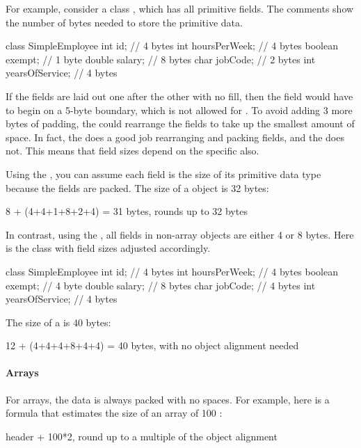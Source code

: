 For example, consider a class , which has all primitive fields.
The comments show the number of bytes needed to store the primitive data.

\begin{shortlisting}
class SimpleEmployee {
    int id;               // 4 bytes
    int hoursPerWeek;     // 4 bytes       
    boolean exempt;       // 1 byte          
    double salary;        // 8 bytes          
    char jobCode;         // 2 bytes           
    int yearsOfService;   // 4 bytes      	
}
\end{shortlisting}

If the fields are laid out one after the other with no fill, then the
field  would have to begin on a 5-byte boundary, which is not allowed for
. To avoid adding 3 more bytes of padding, the \jre could rearrange the fields
to take up the smallest amount of space. In fact, the \oracle \jre does a good job rearranging and
packing fields, and the \ibm \jre does not. This means that field sizes depend on the specific \jre also. 

Using the \oracle \jre, you can assume each field is the size of its primitive data type because the fields are packed. The size of a
 object is 32 bytes:

\begin{shortlisting}               
8 + (4+4+1+8+2+4) = 31 bytes, rounds up to 32 bytes
\end{shortlisting} 

In contrast, using the \ibm \jre, all fields in non-array objects are either 4
or 8 bytes. Here is the  class with field sizes adjusted
accordingly.
\begin{shortlisting} 
class SimpleEmployee {
    int id;                  // 4 bytes
    int hoursPerWeek;        // 4 bytes
    boolean exempt;          // 4 byte
    double salary;           // 8 bytes
    char jobCode;            // 4 bytes
    int yearsOfService;      // 4 bytes
}
\end{shortlisting}
The size of a  is 40 bytes:
\begin{shortlisting}
12 + (4+4+4+8+4+4) = 40 bytes, with no object alignment needed
\end{shortlisting}

\paragraph{Arrays} For arrays, the data is always packed with no spaces. For
example, here is a formula that estimates the size of an array of 100 :
\begin{shortlisting}
header + 100*2, round up to a multiple of the object alignment
\end{shortlisting}

